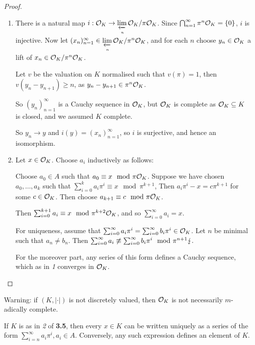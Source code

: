 \documentclass[10pt,a4paper]{article}
\begin{document}
\begin{proof}\hspace*{0cm}
  \begin{enumerate}[label=\textit{\arabic*.}]
    \item There is a natural map $i:\mathcal{O}_K \to \lim\limits_{\xleftarrow[n]{}} \mathcal{O}_K/\pi\mathcal{O}_K$. Since $\bigcap_{n=1}^\infty \pi^n \mathcal{O}_K = \{0\}$, $i$ is injective. Now let $(x_n)_{n=1}^\infty \in \lim\limits_{\xleftarrow[n]{}}\mathcal{O}_K/\pi^n\mathcal{O}_K$,
    and for each $n$ choose $y_n \in \mathcal{O}_K$ a lift of $x_n \in \mathcal{O}_K/\pi^n\mathcal{O}_K$.

    Let $v$ be the valuation on $K$ normalised such that $v(\pi) = 1$, then $v(y_n - y_{n+1}) \geq n$, as $y_n - y_{n+1} \in \pi^n \mathcal{O}_K$.

    So $(y_n)_{n=1}^\infty$ is a Cauchy sequence in $\mathcal{O}_K$, but $\mathcal{O}_K$ is complete as $\mathcal{O}_K \subseteq K$ is closed, and we assumed $K$ complete.

    So $y_n \to y$ and $i(y) = (x_n)_{n=1}^\infty$, so $i$ is surjective, and hence an isomorphism.

    \item Let $x \in \mathcal{O}_K$. Choose $a_i$ inductively as follows:

    Choose $a_0 \in A$ such that $a_0 \equiv x \mod \pi\mathcal{O}_K$. Suppose we have chosen $a_0, \ldots, a_k$ such that $\sum_{i=0}^k a_i \pi^i \equiv x \mod \pi^{k+1}$, Then $a_i \pi^i - x  = c\pi^{k+1}$ for some $c \in \mathcal{O}_K$. Then choose $a_{k+1} \equiv c \mod \pi\mathcal{O}_K$.

    Then $\sum_{i=0}^{k+1} a_i \equiv x \mod \pi^{k+2}\mathcal{O}_K$, and so $\sum_{i=0}^\infty a_i =x$.

    For uniqueness, assume that $\sum_{i=0}^\infty a_i \pi^i = \sum_{i=0}^\infty b_i \pi^i \in \mathcal{O}_K$. Let $n$ be minimal such that $a_n \neq b_n$. Then $\sum_{i=0}^\infty a_i \not\equiv \sum_{i=0}^\infty b_i \pi^i \mod \pi^{n+1} \lightning.$

    For the moreover part, any series of this form defines a Cauchy sequence, which as in \textit{1} converges in $\mathcal{O}_K$.
  \end{enumerate}
\end{proof}

Warning: if $(K, |\cdot|)$ is not discretely valued, then $\mathcal{O}_K$ is not necessarily $m$-adically complete.

\begin{corollary}
  If $K$ is as in \textit{2} of \textbf{3.5}, then every $x \in K$ can be written uniquely as a series of the form $\sum_{i=n}^\infty a_i \pi^i, a_i \in A$. Conversely, any such expression defines an element of $K$.
\end{corollary}
\end{document}
